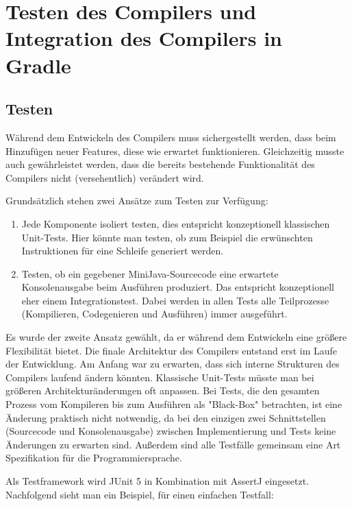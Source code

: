 \chapter{Testen des Compilers und Integration des Compilers in Gradle}

\section{Testen}

Während dem Entwickeln des Compilers muss sichergestellt werden, dass beim Hinzufügen neuer Features, diese wie erwartet funktionieren. Gleichzeitig musste auch gewährleistet werden, dass die bereits bestehende Funktionalität des Compilers nicht (versehentlich) verändert wird.

Grundsätzlich stehen zwei Ansätze zum Testen zur Verfügung:
\begin{enumerate}
    \item Jede Komponente isoliert testen, dies entspricht konzeptionell klassischen Unit-Tests. Hier könnte man testen, ob zum Beispiel die erwünschten Instruktionen für eine Schleife generiert werden. 
    \item Testen, ob ein gegebener MiniJava-Sourcecode eine erwartete Konsolenausgabe beim Ausführen produziert. Das entspricht konzeptionell eher einem Integrationstest. Dabei werden in allen Tests alle Teilprozesse (Kompilieren, Codegenieren und Ausführen) immer ausgeführt.
\end{enumerate}

Es wurde der zweite Ansatz gewählt, da er während dem Entwickeln eine größere Flexibilität bietet. Die finale Architektur des Compilers entstand erst im Laufe der Entwicklung. Am Anfang war zu erwarten, dass sich interne Strukturen des Compilers laufend ändern könnten. Klassische Unit-Tests müsste man bei größeren Architekturänderungen oft anpassen. Bei Tests, die den gesamten Prozess vom Kompileren bis zum Ausführen als "Black-Box" betrachten, ist eine Änderung praktisch nicht notwendig, da bei den einzigen zwei Schnittstellen (Sourcecode und Konsolenausgabe) zwischen Implementierung und Tests keine Änderungen zu erwarten sind. Außerdem sind alle Testfälle gemeinsam eine Art Spezifikation für die Programmiersprache.

Als Testframework wird JUnit 5 \cite{JUnit} in Kombination mit AssertJ \cite{AssertJ} eingesetzt. Nachfolgend sieht man ein Beispiel, für einen einfachen Testfall:



